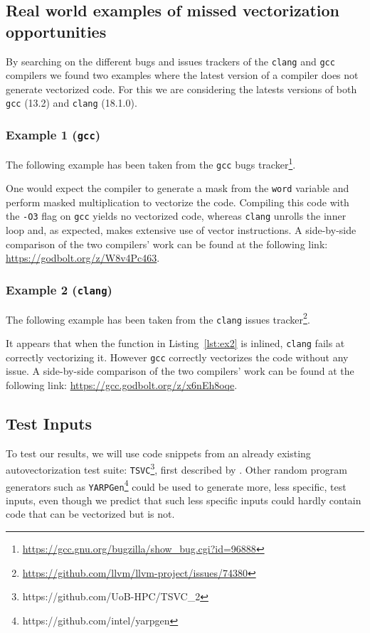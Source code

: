 \documentclass[acmsmall,review, nonacm]{acmart}
\begin{document}
\subsection{Real world examples of missed vectorization opportunities} \label{examples}
By searching on the different bugs and issues trackers of the \texttt{clang} and \texttt{gcc} 
compilers we found two examples where the latest version of a compiler does not 
generate vectorized code. For this we are considering the latests versions of 
both \texttt{gcc} (13.2) and \texttt{clang} (18.1.0).

\subsubsection{Example 1 (\texttt{gcc})}
The following example has been taken from the \texttt{gcc} bugs tracker\footnote{\url{https://gcc.gnu.org/bugzilla/show_bug.cgi?id=96888}}.

One would expect the compiler to generate a mask from the \texttt{word} variable 
and perform masked multiplication to vectorize the code.
Compiling this code with the \texttt{-O3} flag on \texttt{gcc} yields no vectorized code, whereas \texttt{clang} unrolls the inner loop and, 
as expected, makes extensive use of vector instructions. A side-by-side comparison of the two compilers' work can be found 
at the following link: \url{https://godbolt.org/z/W8v4Pc463}.
% 

\subsubsection{Example 2 (\texttt{clang})}
The following example has been taken from the \texttt{clang} issues tracker\footnote{\url{https://github.com/llvm/llvm-project/issues/74380}}.

It appears that when the function in Listing~\ref{lst:ex2} is inlined, \texttt{clang} fails at correctly vectorizing it. However
\texttt{gcc} correctly vectorizes the code without any issue.
A side-by-side comparison of the two compilers' work can be found 
at the following link: \url{https://gcc.godbolt.org/z/x6nEh8oqe}.

\subsection{Test Inputs}
To test our results, we will use code snippets from an already existing autovectorization test suite: \texttt{TSVC}\footnote{https://github.com/UoB-HPC/TSVC\_2}, first described by \citet{Callahan88}.
Other random program generators such as \texttt{YARPGen}\footnote{https://github.com/intel/yarpgen} could be used to generate more, less specific, test inputs, even though
we predict that such less specific inputs could hardly contain code that can be vectorized but is not.
\end{document}
